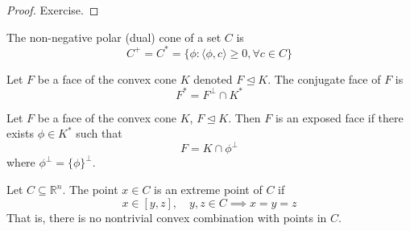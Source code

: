 \begin{proof}[Proof]
    Exercise.
\end{proof}
\begin{definition}
    The non-negative polar (dual) cone of a set $C$ is
    $$C^+ = C^* = \{\phi : \langle \phi, c \rangle \geq 0, \forall c \in C\}$$
\end{definition}
\begin{definition}
    Let $F$ be a face of the convex cone $K$ denoted $F \unlhd K$. The conjugate face of $F$ is $$F^* = F^\bot \cap K^*$$
\end{definition}
\begin{definition}
    Let $F$ be a face of the convex cone $K$, $F \unlhd K$. Then $F$ is an exposed face if there exists $\phi \in K^*$ such that
    $$F = K \cap \phi^\bot$$
    where $\phi^\bot = \{\phi\}^\bot$.
\end{definition}
\begin{definition}
    Let $C \subseteq \mathbb R^n$. The point $x \in C$ is an extreme point of $C$ if
    $$x \in [y,z], \quad y, z \in C \implies x = y = z$$
    That is, there is no nontrivial convex combination with points in $C$.
\end{definition}